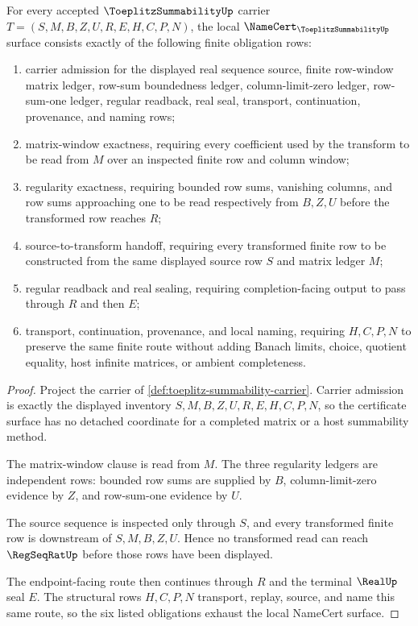 \begin{theorem}\label{thm:toeplitz-summability-namecert-obligations}
For every accepted $\ToeplitzSummabilityUp$ carrier $T=(S,M,B,Z,U,R,E,H,C,P,N)$, the local $\NameCert_{\ToeplitzSummabilityUp}$ surface consists exactly of the following finite obligation rows:
\begin{enumerate}
\item carrier admission for the displayed real sequence source, finite row-window matrix ledger, row-sum boundedness ledger, column-limit-zero ledger, row-sum-one ledger, regular readback, real seal, transport, continuation, provenance, and naming rows;
\item matrix-window exactness, requiring every coefficient used by the transform to be read from $M$ over an inspected finite row and column window;
\item regularity exactness, requiring bounded row sums, vanishing columns, and row sums approaching one to be read respectively from $B,Z,U$ before the transformed row reaches $R$;
\item source-to-transform handoff, requiring every transformed finite row to be constructed from the same displayed source row $S$ and matrix ledger $M$;
\item regular readback and real sealing, requiring completion-facing output to pass through $R$ and then $E$;
\item transport, continuation, provenance, and local naming, requiring $H,C,P,N$ to preserve the same finite route without adding Banach limits, choice, quotient equality, host infinite matrices, or ambient completeness.
\end{enumerate}
\end{theorem}
\begin{proof}
Project the carrier of \autoref{def:toeplitz-summability-carrier}. Carrier admission is exactly the displayed inventory $S,M,B,Z,U,R,E,H,C,P,N$, so the certificate surface has no detached coordinate for a completed matrix or a host summability method.

The matrix-window clause is read from $M$. The three regularity ledgers are independent rows: bounded row sums are supplied by $B$, column-limit-zero evidence by $Z$, and row-sum-one evidence by $U$.

The source sequence is inspected only through $S$, and every transformed finite row is downstream of $S,M,B,Z,U$. Hence no transformed read can reach $\RegSeqRatUp$ before those rows have been displayed.

The endpoint-facing route then continues through $R$ and the terminal $\RealUp$ seal $E$. The structural rows $H,C,P,N$ transport, replay, source, and name this same route, so the six listed obligations exhaust the local NameCert surface.
\end{proof}


